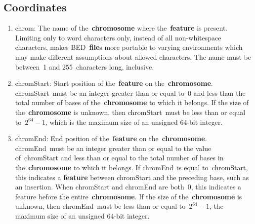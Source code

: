 \documentclass[11pt]{article}
\begin{document}
\subsection{Coordinates}
\begin{enumerate}
\item \textsf{chrom}: The name of the~\textbf{chromosome} where the~\textbf{feature} is present.
  Limiting only to word characters only, instead of all non-whitespace characters, makes \ac{BED}~\textbf{file}s more portable to varying environments which may make different assumptions about allowed characters.
  The name must be between~1 and 255~characters long, inclusive.

\item \textsf{chromStart}: Start position of the~\textbf{feature} on the~\textbf{chromosome}.
  \textsf{chromStart}~must be an integer greater than or equal to~0 and less than the total number of bases of the~\textbf{chromosome} to which it belongs.
  If the size of the~\textbf{chromosome} is unknown, then \textsf{chromStart}~must be less than or equal to~$2^{64} - 1$, which is the maximum size of an unsigned 64-bit integer.

\item \textsf{chromEnd}: End position of the~\textbf{feature} on the~\textbf{chromosome}.
  \textsf{chromEnd}~must be an integer greater than or equal to the value of~\textsf{chromStart} and less than or equal to the total number of bases in the~\textbf{chromosome} to which it belongs.
  If \textsf{chromEnd}~is equal to~\textsf{chromStart}, this indicates a \textbf{feature} between \textsf{chromStart} and the preceding base, such as an insertion.
  When \textsf{chromStart} and \textsf{chromEnd} are both~0, this indicates a feature before the entire~\textbf{chromosome}.
  If the size of the~\textbf{chromosome} is unknown, then \textsf{chromEnd}~must be less than or equal to~$2^{64} - 1$, the maximum size of an unsigned 64-bit integer.
\end{enumerate}
\end{document}
